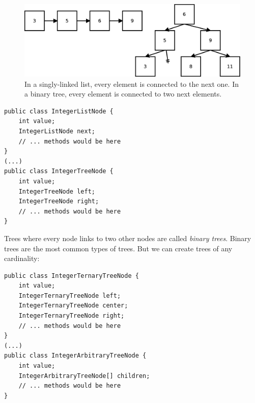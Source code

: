 \begin{figure}[hbtp]
  \centering
  \includegraphics[width=\textwidth]{gfx/list-tree}
  \caption{In a singly-linked list, every element is connected to the next one. In a binary tree, every element is connected to two next elements.}
  \label{fig:listree}
\end{figure}

\begin{verbatim}
public class IntegerListNode {
    int value;
    IntegerListNode next;
    // ... methods would be here
}
(...)
public class IntegerTreeNode {
    int value;
    IntegerTreeNode left;
    IntegerTreeNode right;
    // ... methods would be here
}
\end{verbatim}

Trees where every node links to two other nodes are called
\emph{binary trees}. Binary trees are the most common types of
trees. But we can create trees of any cardinality:

\begin{verbatim}
public class IntegerTernaryTreeNode {
    int value;
    IntegerTernaryTreeNode left;
    IntegerTernaryTreeNode center;
    IntegerTernaryTreeNode right;
    // ... methods would be here
}
(...)
public class IntegerArbitraryTreeNode {
    int value;
    IntegerArbitraryTreeNode[] children;
    // ... methods would be here
}
\end{verbatim}

